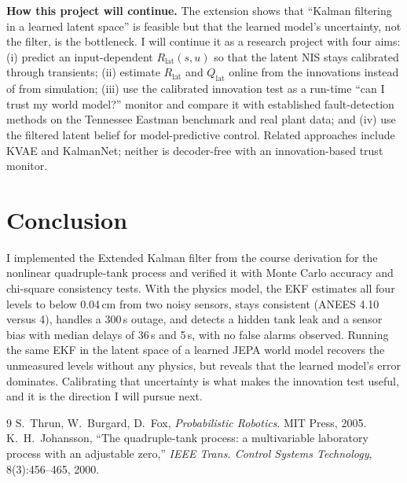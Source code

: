 \documentclass[11pt]{article}
\begin{document}
\textbf{How this project will continue.} The extension shows that ``Kalman filtering in a learned latent space'' is feasible but that the learned model's uncertainty, not the filter, is the bottleneck. I will continue it as a research project with four aims: (i) predict an input-dependent $R_{\text{lat}}(s,u)$ so that the latent NIS stays calibrated through transients; (ii) estimate $R_{\text{lat}}$ and $Q_{\text{lat}}$ online from the innovations instead of from simulation; (iii) use the calibrated innovation test as a run-time ``can I trust my world model?'' monitor and compare it with established fault-detection methods on the Tennessee Eastman benchmark and real plant data; and (iv) use the filtered latent belief for model-predictive control. Related approaches include KVAE and KalmanNet; neither is decoder-free with an innovation-based trust monitor.

\section{Conclusion}
I implemented the Extended Kalman filter from the course derivation for the nonlinear quadruple-tank process and verified it with Monte Carlo accuracy and chi-square consistency tests. With the physics model, the EKF estimates all four levels to below 0.04\,cm from two noisy sensors, stays consistent (ANEES 4.10 versus 4), handles a 300\,s outage, and detects a hidden tank leak and a sensor bias with median delays of 36\,s and 5\,s, with no false alarms observed. Running the same EKF in the latent space of a learned JEPA world model recovers the unmeasured levels without any physics, but reveals that the learned model's error dominates. Calibrating that uncertainty is what makes the innovation test useful, and it is the direction I will pursue next.

\begin{thebibliography}{9}\small
\setlength{\itemsep}{2pt}
\setlength{\parskip}{0pt}
 S.~Thrun, W.~Burgard, D.~Fox, \emph{Probabilistic Robotics}. MIT Press, 2005.
 K.~H.~Johansson, ``The quadruple-tank process: a multivariable laboratory process with an adjustable zero,'' \emph{IEEE Trans. Control Systems Technology}, 8(3):456--465, 2000.
\end{thebibliography}
\end{document}
